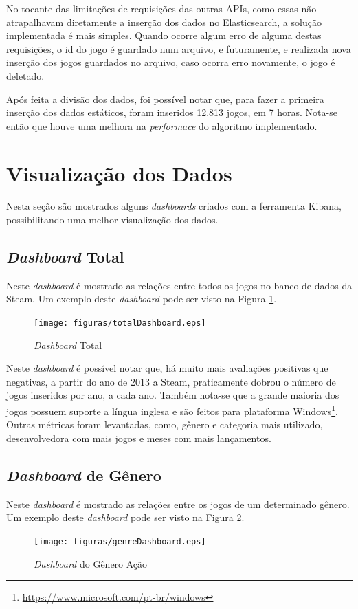 No tocante das limitações de requisições das outras APIs, como essas não atrapalhavam diretamente a inserção dos dados no Elasticsearch, a solução implementada é mais simples. Quando ocorre algum erro de alguma destas requisições, o id do jogo é guardado num arquivo, e futuramente, e realizada nova inserção dos jogos guardados no arquivo, caso ocorra erro novamente, o jogo é deletado.	

Após feita a divisão dos dados, foi possível notar que, para fazer a primeira inserção dos dados estáticos, foram inseridos 12.813 jogos, em 7 horas. Nota-se então que houve uma melhora na \textit{performace} do algoritmo implementado.

\section{Visualização dos Dados}
Nesta seção são mostrados alguns \textit{dashboards} criados com a ferramenta Kibana, possibilitando uma melhor visualização dos dados.

\subsection*{\textit{Dashboard} Total}
Neste \textit{dashboard} é mostrado as relações entre todos os jogos no banco de dados da Steam. Um exemplo deste \textit{dashboard} pode ser visto na Figura \ref{image:totalDash}.
\begin{figure} [H]
\centering
\texttt{[image: figuras/totalDashboard.eps]}
\caption{\textit{Dashboard} Total}
\label{image:totalDash}
\end{figure}

Neste \textit{dashboard} é possível notar que, há muito mais avaliações positivas que negativas, a partir do ano de 2013 a Steam, praticamente dobrou o número de jogos inseridos por ano, a cada ano. Também nota-se que a grande maioria dos jogos possuem suporte a língua inglesa e são feitos para plataforma Windows\footnote[1]{\url{https://www.microsoft.com/pt-br/windows}}. Outras métricas foram levantadas, como, gênero e categoria mais utilizado, desenvolvedora com mais jogos e meses com mais lançamentos.

\subsection*{\textit{Dashboard} de Gênero}
Neste \textit{dashboard} é mostrado as relações entre os jogos de um determinado gênero. Um exemplo deste \textit{dashboard} pode ser visto na Figura \ref{image:genreDash}.
\begin{figure} [H]
\centering
\texttt{[image: figuras/genreDashboard.eps]}
\caption{\textit{Dashboard} do Gênero Ação}
\label{image:genreDash}
\end{figure}


